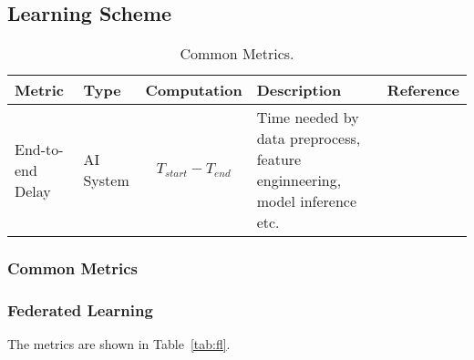 \subsection{Learning Scheme}


\begin{table}[h]
\caption{Common Metrics.} 
\label{tab:common}
\begin{tabular}{|l|l|p{3cm}|p{4cm}|p{4cm}|}
\hline
Metric                 & Type      & Computation & Description                                                                & Reference \\ \hline
End-to-end Delay
& AI System 
& 
\parbox{3cm}{
    \begin{equation} \label{equ:ed} 
    T_{start} - T_{end}
    \end{equation}
}
& Time needed by data preprocess, feature enginneering, model inference etc. 
&           
\\ \hline

\end{tabular}
\end{table}



\subsubsection{Common Metrics}


\subsubsection{Federated Learning}

The metrics are shown in Table~\ref{tab:fl}.



